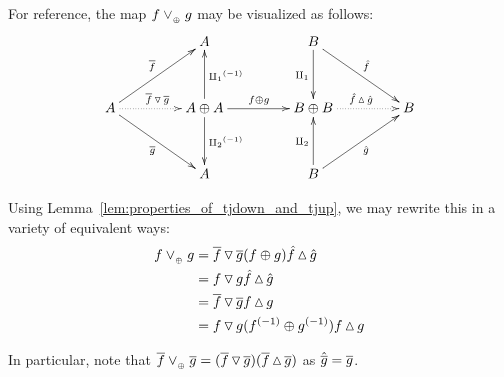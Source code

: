 For reference, the map $f \vee_{{_{\oplus}}} g$ may be visualized as follows:
\[
  \xymatrix@C+20pt @R+10pt{
    &A
      & B  \ar[dr]^{\rg{f}} \ar[d]_{\cpa}\\
    A \ar[ur]^{\rst{f}} \ar@{.>}[r]^{\rst{f}\tjdown \rst{g}} \ar[dr]_{\rst{g}}
      & A\+A \ar[u]_{\icpa} \ar[d]^{\icpb}
        \ar[r]^{f\+g}
       &B\+B \ar@{.>}[r]^{\rg{f}\tjup\rg{g}} & B\\
    & A & B\ar[ur]_{\rg{g}} \ar[u]^{\cpb}
  }
\]

Using Lemma~\ref{lem:properties_of_tjdown_and_tjup}, we may rewrite this in a variety of
equivalent ways:
\begin{align*}
  f \vee_{{_{\oplus}}} g &= \overline{f}\operatorname{\triangledown}\overline{g} (f\oplus g) \hat{f}\operatorname{\vartriangle}\hat{g} \\
  &= f \operatorname{\triangledown} g \hat{f}\operatorname{\vartriangle}\hat{g}\\
  & = \overline{f}\operatorname{\triangledown}\overline{g}  f\operatorname{\vartriangle} g\\
  & = f \operatorname{\triangledown} g ({f}^{(-1)}\oplus{g}^{(-1)})f\operatorname{\vartriangle} g
\end{align*}

In particular, note that $\overline{f}\vee_{{_{\oplus}}} \overline{g} = (\overline{f} \operatorname{\triangledown} \overline{g})
(\overline{f}\operatorname{\vartriangle}\overline{g})$ as $\hat{\overline{g}} = \overline{g}$.

